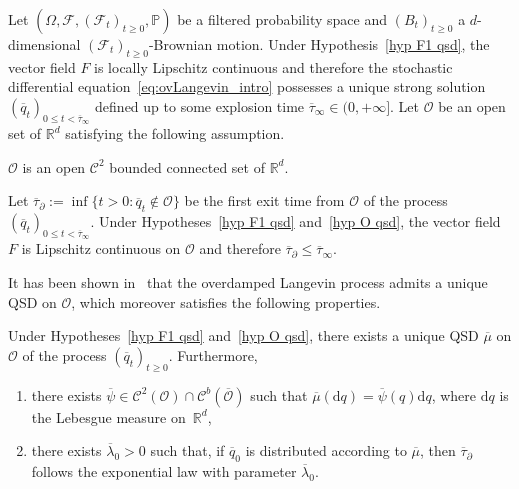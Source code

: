 \documentclass[preprint,EJP]{ejpecp}
\begin{document}
Let $(\Omega,\mathcal{F},(\mathcal{F}_t)_{t\geq0},\mathbb{P})$ be a filtered probability space and $(B_t)_{t\geq0}$ a $d$-dimensional $(\mathcal{F}_t)_{t\geq0}$-Brownian motion. Under Hypothesis~\ref{hyp F1 qsd}, the vector field $F$ is locally Lipschitz continuous and therefore the stochastic differential equation~\eqref{eq:ovLangevin_intro} possesses a unique strong solution $(\overline{q}_t)_{0 \leq t < \overline{\tau}_\infty}$ defined up to some explosion time $\overline{\tau}_\infty \in (0,+\infty]$.
Let $\mathcal{O}$ be an open set of $\mathbb{R}^d$ satisfying the following assumption.
\begin{hypothesis}\label{hyp O qsd}
$\mathcal{O}$ is an open $\mathcal{C}^2$ bounded connected set of $\mathbb{R}^d$. 
\end{hypothesis}
Let $\overline{\tau}_{\partial}:=\inf \{t>0: \overline{q}_t\notin \mathcal{O}\}$ be the first exit time from $\mathcal{O}$ of the process $(\overline{q}_t)_{0 \leq t < \overline{\tau}_\infty}$. Under Hypotheses~\ref{hyp F1 qsd} and~\ref{hyp O qsd}, the vector field $F$ is Lipschitz continuous on $\mathcal{O}$ and therefore $\overline{\tau}_\partial \leq \overline{\tau}_\infty$. 

It has been shown in~\cite{V3,GQZ,LebLelPer,KnobPart} that the overdamped Langevin process admits a unique QSD on $\mathcal{O}$, which moreover satisfies the following properties.
\begin{theorem}\label{qsd overdamped} Under Hypotheses~\ref{hyp F1 qsd} and~\ref{hyp O qsd}, there exists a unique QSD $\overline{\mu}$ on $\mathcal{O}$ of the process $(\overline{q}_t)_{t\geq0}$. Furthermore, 
\begin{enumerate} 
\item there exists $\overline{\psi}\in\mathcal{C}^2(\mathcal{O})\cap\mathcal{C}^b(\overline{\mathcal{O}})$ such that $\overline{\mu}(\mathrm{d}q)=\overline{\psi}(q)\mathrm{d}q$, where $\mathrm{d}q$ is the Lebesgue measure on~$\mathbb{R}^d$,
\item there exists $\overline{\lambda}_0>0$ such that, if $\overline{q}_0$ is distributed according to $\overline{\mu}$, then $\overline{\tau}_\partial$ follows the exponential law with parameter $\overline{\lambda}_0$.
\end{enumerate}
\end{theorem}
\end{document}
